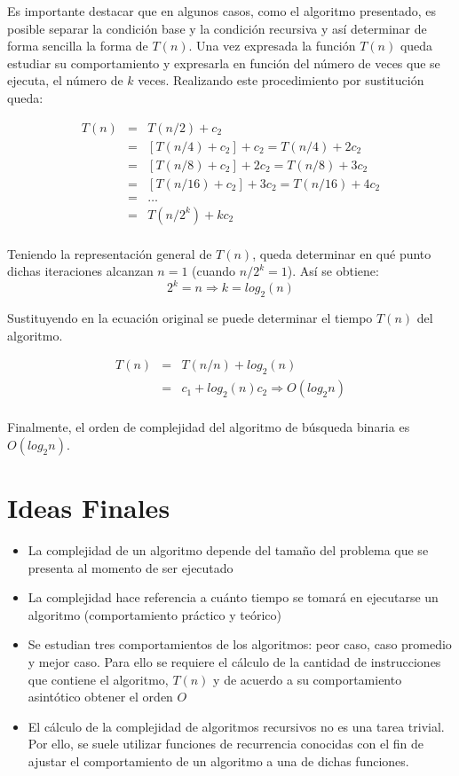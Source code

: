 Es importante destacar que en algunos casos, como el algoritmo presentado, es posible separar la condición base y la condición recursiva y así determinar de forma sencilla la forma de $T(n)$. Una vez expresada la función $T(n)$ queda estudiar su comportamiento y expresarla en función del número de veces que se ejecuta, el número de $k$ veces. Realizando este procedimiento por sustitución queda:

\begin{eqnarray*}
T(n)&=&T(n/2) + c_2\\
&=&\left [ T(n/4) + c_2\right ] + c_2 = T(n/4) + 2c_2\\
&=&\left [ T(n/8) + c_2\right ] + 2c_2 = T(n/8) + 3c_2\\
&=&\left [ T(n/16) + c_2\right ] + 3c_2 = T(n/16) + 4c_2\\
&=&\dots\\
&=&T(n/2^k) + kc_2\\
\end{eqnarray*}

Teniendo la representación general de $T(n)$, queda determinar en qué punto dichas iteraciones alcanzan $n=1$ (cuando $n/2^{k} = 1$). Así se obtiene:
$$2^{k} = n \Rightarrow k = log_2(n)$$

Sustituyendo en la ecuación original se puede determinar el tiempo $T(n)$ del algoritmo.

\begin{eqnarray*}
T(n)&=&T(n/n) + log_2(n)\\
&=&c_1 + log_2(n)c_2 \Rightarrow O(log_2n) \\
\end{eqnarray*}

Finalmente, el orden de complejidad del algoritmo de búsqueda binaria es $O(log_2n)$.

\section{Ideas Finales}
\begin{itemize}
\item La complejidad de un algoritmo depende del tamaño del problema que se presenta al momento de ser ejecutado
\item La complejidad hace referencia a cuánto tiempo se tomará en ejecutarse un algoritmo (comportamiento práctico y teórico)
\item Se estudian tres comportamientos de los algoritmos: peor caso, caso promedio y mejor caso. Para ello se requiere el cálculo de la cantidad de instrucciones que contiene el algoritmo, $T(n)$ y de acuerdo a su comportamiento asintótico obtener el orden $O$
\item El cálculo de la complejidad de algoritmos recursivos no es una tarea trivial. Por ello, se suele utilizar funciones de recurrencia conocidas con el fin de ajustar el comportamiento de un algoritmo a una de dichas funciones.
\end{itemize}

